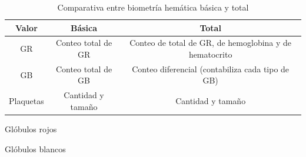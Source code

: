 \begin{table}
\centering
\caption{Comparativa entre biometría hemática básica y total}
\label{tab:comparar_biometrías}
\begin{threeparttable}
{
\begin{tabular}{ccc}\hline

    \textbf{Valor} & \textbf{Básica} & \textbf{Total} \\ \hline
    
    GR\tnote{1} & Conteo total de GR &  Conteo de total de GR, de hemoglobina y de hematocrito \\    
    GB\tnote{2} & Conteo total de GB & Conteo diferencial (contabiliza cada tipo de GB) \\
    Plaquetas & Cantidad y tamaño & Cantidad y tamaño\\
    
    \hline
\end{tabular}
}
\begin{tablenotes}
    \item[1] Glóbulos rojos
    \item[2] Glóbulos blancos
\end{tablenotes}
\end{threeparttable}
\end{table}